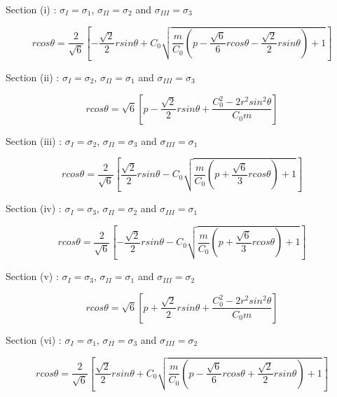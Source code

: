 Section (i) : $\sigma_I = \sigma_1$, $\sigma_{II} = \sigma_2$ and $\sigma_{III} = \sigma_3$

\begin{equation}
    r cos\theta = \frac{2}{\sqrt{6}}\left[-\frac{\sqrt{2}}{2} r sin\theta + C_0 \sqrt{\frac{m}{C_0} \left(p-\frac{\sqrt{6}}{6} r cos\theta - \frac{\sqrt{2}}{2} r sin\theta \right)+1}\right]
\end{equation}

Section (ii) : $\sigma_I = \sigma_2$, $\sigma_{II} = \sigma_1$ and $\sigma_{III} = \sigma_3$

\begin{equation}
    r cos\theta = \sqrt{6}\left[p-\frac{\sqrt{2}}{2} r sin\theta + \frac{C_0^2-2 r^2 sin^2\theta}{C_0 m}\right]
\end{equation}

Section (iii) : $\sigma_I = \sigma_2$, $\sigma_{II} = \sigma_3$ and $\sigma_{III} = \sigma_1$

\begin{equation}
    r cos\theta = \frac{2}{\sqrt{6}}\left[\frac{\sqrt{2}}{2} r sin\theta - C_0 \sqrt{\frac{m}{C_0} \left(p+\frac{\sqrt{6}}{3} r cos\theta \right)+1}\right]
\end{equation}

Section (iv) : $\sigma_I = \sigma_3$, $\sigma_{II} = \sigma_2$ and $\sigma_{III} = \sigma_1$

\begin{equation}
    r cos\theta = \frac{2}{\sqrt{6}}\left[-\frac{\sqrt{2}}{2} r sin\theta - C_0 \sqrt{\frac{m}{C_0} \left(p+\frac{\sqrt{6}}{3} r cos\theta \right)+1}\right]
\end{equation}

Section (v) : $\sigma_I = \sigma_3$, $\sigma_{II} = \sigma_1$ and $\sigma_{III} = \sigma_2$

\begin{equation}
    r cos\theta = \sqrt{6}\left[p+\frac{\sqrt{2}}{2} r sin\theta + \frac{C_0^2-2 r^2 sin^2\theta}{C_0 m}\right]
\end{equation}

Section (vi) : $\sigma_I = \sigma_1$, $\sigma_{II} = \sigma_3$ and $\sigma_{III} = \sigma_2$

\begin{equation}
    r cos\theta = \frac{2}{\sqrt{6}}\left[\frac{\sqrt{2}}{2} r sin\theta + C_0 \sqrt{\frac{m}{C_0} \left(p-\frac{\sqrt{6}}{6} r cos\theta + \frac{\sqrt{2}}{2} r sin\theta \right)+1}\right]
\end{equation}

